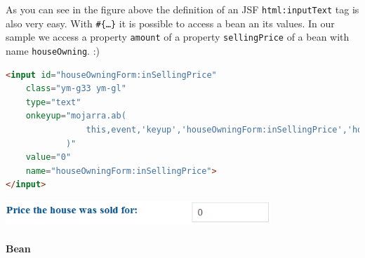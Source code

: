 As you can see in the figure above the definition of an JSF
\texttt{html:inputText} tag is also very easy. With \texttt{\#\{\ldots\}} it is
possible to access a bean an its values. In our sample we access a property
\texttt{amount} of a property \texttt{sellingPrice} of a bean with name
\texttt{houseOwning}. :)

\begin{lstlisting}[language=HTML]
<input id="houseOwningForm:inSellingPrice" 
	class="ym-g33 ym-gl" 
	type="text"
	onkeyup="mojarra.ab(
				this,event,'keyup','houseOwningForm:inSellingPrice','houseOwningForm:grp_ValueReside'
			)"
	value="0" 
	name="houseOwningForm:inSellingPrice">
</input>
\end{lstlisting}

\begin{center}
 \includegraphics[width=10cm]{./images/chapter02/referenceimpl_forms_text.png}
\end{center}

\paragraph{Bean}





